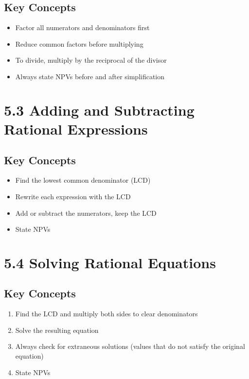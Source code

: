 \documentclass[12pt]{article}
\begin{document}
\subsection*{Key Concepts}
\begin{tcolorbox}[colback=lightgray,colframe=primary,title=Multiplying and Dividing]
    \begin{itemize}
        \item Factor all numerators and denominators first
        \item Reduce common factors before multiplying
        \item To divide, multiply by the reciprocal of the divisor
        \item Always state NPVs before and after simplification
    \end{itemize}
\end{tcolorbox}

\section{5.3 Adding and Subtracting Rational Expressions}
\subsection*{Key Concepts}
\begin{tcolorbox}[colback=lightgray,colframe=primary,title=Adding and Subtracting]
    \begin{itemize}
        \item Find the lowest common denominator (LCD)
        \item Rewrite each expression with the LCD
        \item Add or subtract the numerators, keep the LCD
        \item State NPVs
    \end{itemize}
\end{tcolorbox}

\section{5.4 Solving Rational Equations}
\subsection*{Key Concepts}
\begin{tcolorbox}[colback=lightgray,colframe=primary,title=Solving Rational Equations]
    \begin{enumerate}
        \item Find the LCD and multiply both sides to clear denominators
        \item Solve the resulting equation
        \item Always check for extraneous solutions (values that do not satisfy the original equation)
        \item State NPVs
    \end{enumerate}
\end{tcolorbox}
\end{document}
